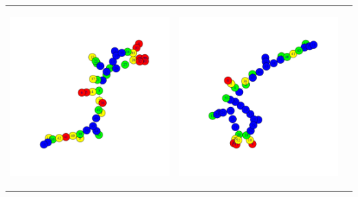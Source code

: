 \documentclass[eu,gi]{ifirak}\usepackage[]{graphicx}\usepackage[]{color}
\begin{document}
\begin{table}[hbt!]
\begin{tabular}{c c c}
\begin{center}
    \includegraphics[scale=0.3]{graph3.pdf}
\end{center}
&
\begin{center}
    \includegraphics[scale=0.3]{graph4.pdf}

\end{center}
\end{tabular}
\end{table}
\end{document}
